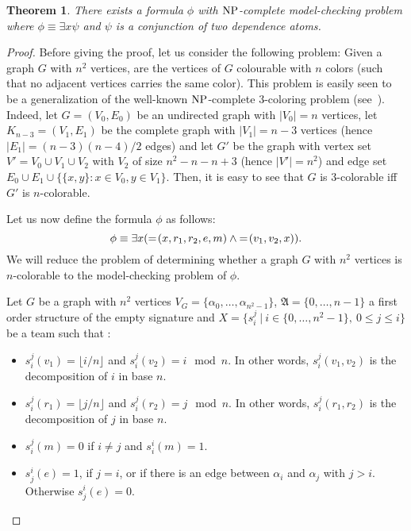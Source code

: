 \documentclass{article}
\theoremstyle{plain}
\newtheorem{theorem}{Theorem}
\theoremstyle{definition}
\newcommand{\mA}{{\mathfrak A}}
\newcommand*\dep{{=\mkern-1.2mu}}
\newcommand{\np}{{\rm NP}}
\begin{document}
\begin{theorem}\label{Exists+wedge} 
There exists a formula $\phi$ with $\np$-complete model-checking problem where $\phi\equiv \exists x \psi$ and $\psi$ is a conjunction of two dependence atoms.



\end{theorem}

\begin{proof}
Before giving the proof, let us consider the following problem: Given  a graph $G$ with  $n^2$ vertices, are the vertices of $G$ colourable with $n$ colors (such that no adjacent vertices carries the same color). This problem is easily seen to be a generalization of the well-known $\np$-complete $3$-coloring problem (see~\cite{GareyJ1979}). Indeed, let $G=(V_0,E_0)$ be an undirected graph with $|V_0|=n$ vertices, let $K_{n-3}=(V_1,E_1)$ be the complete graph with $|V_1|=n-3$ vertices (hence $|E_1|=(n-3)(n-4)/2$ edges) and let $G'$ be the graph with vertex set $V'=V_0\cup V_1\cup V_2$ with $V_2$ of size $n^2-n-n+3$ (hence $|V'|=n^2$) and edge set $E_0\cup E_1 \cup \{\{x,y\}: x\in V_0, y\in V_1\}$. Then, it is easy to see that $G$ is $3$-colorable iff $G'$ is  
	$n$-colorable.   


Let us now define  the formula $\phi$ as follows:
	$$\phi \equiv \exists x(\dep\left(x,r_1,r_2,e,m\right)\wedge \dep \left(v_1,v_2,x\right)).$$ 
	We will reduce the problem of determining whether a graph $G$ with  $n^2$ vertices is $n$-colorable to the model-checking problem of $\phi$. 

	Let $G$ be a graph with $n^2$ vertices $V_G=\{\alpha_0,\hdots,\alpha_{n^2-1}\}$, $\mA=\{0,\ldots, n-1\}$ a first order structure of the empty signature and $X = \{s_i^j \ |\  i \in \{0,\ldots ,n^2-1\},\  0 \le j\le i \}$ be a team such that :

	\begin{itemize}
		\item $s_i^j(v_1) = \lfloor i/n\rfloor$ and $s_i^j(v_2) = i \mod n$. In other words, $s_i^j(v_1,v_2)$ is the decomposition of $i$ in base $n$.
		\item $s_i^j(r_1) = \lfloor j/n\rfloor $ and $s_i^j(r_2) = j \mod n$. In other words, $s_i^j(r_1,r_2)$ is the decomposition of $j$  in base $n$.
		
		\item $s_i^j(m) = 0$ if $i \neq j$ and $s_i^i(m) = 1$.\item $s_{j}^{i}(e) = 1$, if $j=i$, or if there is an edge between $\alpha_i$ and $\alpha_{j}$ with $j > i$. Otherwise $s_{j}^{i}(e) = 0$.
	\end{itemize}
	

\end{proof}
\end{document}
